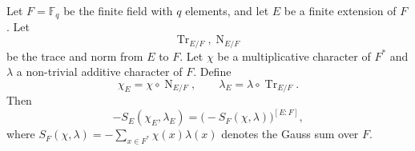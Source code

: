 Let $F = \mathbb{F}_q$ be the finite field with $q$ elements, and let $E$ be a finite extension of $F$. Let
$$\operatorname{Tr}_{E/F}, \operatorname{N}_{E/F}$$
be the trace and norm from $E$ to $F$. Let $\chi$ be a multiplicative character of $F^*$ and $\lambda$ a non-trivial additive character of $F$. Define
$$\chi_E = \chi \circ \operatorname{N}_{E/F}, \qquad \lambda_E = \lambda \circ \operatorname{Tr}_{E/F}.$$
Then
$$-S_E(\chi_E, \lambda_E) = \bigl(-S_F(\chi, \lambda)\bigr)^{[E:F]},$$
where $S_F(\chi, \lambda) = -\sum_{x \in F^*} \chi(x)\lambda(x)$ denotes the Gauss sum over $F$.
